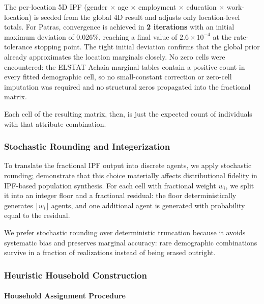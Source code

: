 \documentclass{article}
\begin{document}
The per-location 5D IPF (gender $\times$ age $\times$ employment $\times$ education $\times$ work-location) is seeded from the global 4D result and adjusts only location-level totals. For Patras, convergence is achieved in \textbf{2 iterations} with an initial maximum deviation of 0.026\%, reaching a final value of $2.6 \times 10^{-4}$ at the rate-tolerance stopping point. The tight initial deviation confirms that the global prior already approximates the location marginals closely. No zero cells were encountered: the ELSTAT Achaia marginal tables contain a positive count in every fitted demographic cell, so no small-constant correction or zero-cell imputation was required and no structural zeros propagated into the fractional matrix.

Each cell of the resulting matrix, then, is just the expected count of individuals with that attribute combination.

\subsubsection{Stochastic Rounding and Integerization}\label{stochastic-rounding-and-integerization}

To translate the fractional IPF output into discrete agents, we apply stochastic rounding; \citet{DURANHERAS201878} demonstrate that this choice materially affects distributional fidelity in IPF-based population synthesis. For each cell with fractional weight \(w_i\), we split it into an integer floor and a fractional residual: the floor deterministically generates \(\lfloor w_i\rfloor\) agents, and one additional agent is generated with probability equal to the residual.

We prefer stochastic rounding over deterministic truncation because it avoids systematic bias and preserves marginal accuracy: rare demographic combinations survive in a fraction of realizations instead of being erased outright.

\subsubsection{Heuristic Household Construction}\label{heuristic-household-construction}

\paragraph{Household Assignment Procedure}\label{household-assignment-procedure}
\end{document}

